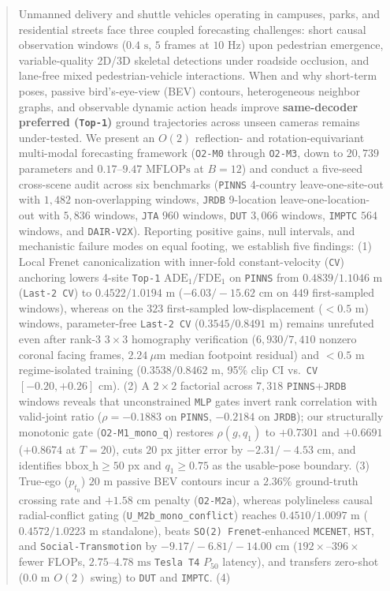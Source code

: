 \documentclass[journal]{IEEEtran}
\begin{document}
\begin{abstract}
Unmanned delivery and shuttle vehicles operating in campuses, parks, and residential streets face three coupled forecasting challenges: short causal observation windows ($0.4\text{ s}$, $5$ frames at $10\text{ Hz}$) upon pedestrian emergence, variable-quality 2D/3D skeletal detections under roadside occlusion, and lane-free mixed pedestrian-vehicle interactions. When and why short-term poses, passive bird's-eye-view (BEV) contours, heterogeneous neighbor graphs, and observable dynamic action heads improve \textbf{same-decoder preferred (\texttt{Top-1})} ground trajectories across unseen cameras remains under-tested. We present an $O(2)$ reflection- and rotation-equivariant multi-modal forecasting framework (\texttt{O2-M0} through \texttt{O2-M3}, down to $20{,}739$ parameters and $0.17\text{--}9.47\text{ MFLOPs}$ at $B=12$) and conduct a five-seed cross-scene audit across six benchmarks (\texttt{PINNS} 4-country leave-one-site-out with $1{,}482$ non-overlapping windows, \texttt{JRDB} 9-location leave-one-location-out with $5{,}836$ windows, \texttt{JTA} $960$ windows, \texttt{DUT} $3{,}066$ windows, \texttt{IMPTC} $564$ windows, and \texttt{DAIR-V2X}). Reporting positive gains, null intervals, and mechanistic failure modes on equal footing, we establish five findings: (1) Local Frenet canonicalization with inner-fold constant-velocity (\texttt{CV}) anchoring lowers 4-site \texttt{Top-1} $\text{ADE}_1 / \text{FDE}_1$ on \texttt{PINNS} from $0.4839 / 1.1046\text{ m}$ (\texttt{Last-2 CV}) to $0.4522 / 1.0194\text{ m}$ ($-6.03 / -15.62\text{ cm}$ on $449$ first-sampled windows), whereas on the $323$ first-sampled low-displacement ($<0.5\text{ m}$) windows, parameter-free \texttt{Last-2 CV} ($0.3545 / 0.8491\text{ m}$) remains unrefuted even after rank-3 $3\times 3$ homography verification ($6{,}930 / 7{,}410$ nonzero coronal facing frames, $2.24\ \mu\text{m}$ median footpoint residual) and $<0.5\text{ m}$ regime-isolated training ($0.3538 / 0.8462\text{ m}$, 95\% clip CI vs.\ \texttt{CV} $[-0.20, +0.26]\text{ cm}$). (2) A $2\times 2$ factorial across $7{,}318$ \texttt{PINNS}+\texttt{JRDB} windows reveals that unconstrained \texttt{MLP} gates invert rank correlation with valid-joint ratio ($\rho = -0.1883$ on \texttt{PINNS}, $-0.2184$ on \texttt{JRDB}); our structurally monotonic gate (\texttt{O2-M1\_mono\_q}) restores $\rho(g, q_1)$ to $+0.7301$ and $+0.6691$ ($+0.8674$ at $T=20$), cuts $20\text{ px}$ jitter error by $-2.31 / -4.53\text{ cm}$, and identifies $\text{bbox\_h} \ge 50\text{ px}$ and $q_1 \ge 0.75$ as the usable-pose boundary. (3) True-ego ($p_{t_0}$) $20\text{ m}$ passive BEV contours incur a $2.36\%$ ground-truth crossing rate and $+1.58\text{ cm}$ penalty (\texttt{O2-M2a}), whereas polylineless causal radial-conflict gating (\texttt{U\_M2b\_mono\_conflict}) reaches $0.4510 / 1.0097\text{ m}$ ($0.4572 / 1.0223\text{ m}$ standalone), beats \texttt{SO(2) Frenet}-enhanced \texttt{MCENET}, \texttt{HST}, and \texttt{Social-Transmotion} by $-9.17 / -6.81 / -14.00\text{ cm}$ ($192\times\text{--}396\times$ fewer FLOPs, $2.75\text{--}4.78\text{ ms}$ \texttt{Tesla T4} $P_{50}$ latency), and transfers zero-shot ($0.0\text{ m}$ $O(2)$ swing) to \texttt{DUT} and \texttt{IMPTC}. (4) 
\end{abstract}
\end{document}

